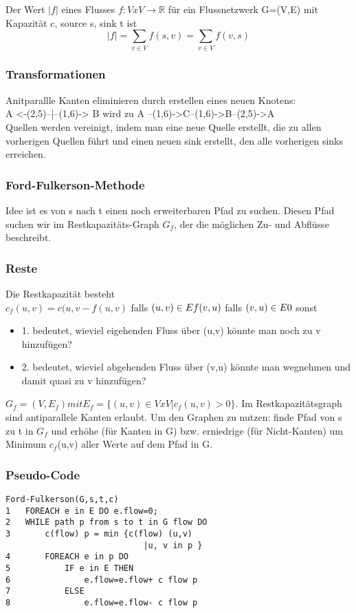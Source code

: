 \documentclass[jou,apacite]{apa6}
\begin{document}
Der Wert $|f|$ eines Flusses $f: VxV \rightarrow \mathbb{R}$ für ein Flussnetzwerk G=(V,E) mit Kapazität c, source s, sink t ist $$|f| = \sum\limits_{v\in V} f(s, v) = \sum\limits_{v\in V} f(v, s)$$

\subsubsection{Transformationen}
Anitparallle Kanten eliminieren durch erstellen eines neuen Knotens: \\
A <-(2,5)--|--(1,6)-> B wird zu A --(1,6)->C--(1,6)->B--(2,5)->A \\
Quellen werden vereinigt, indem man eine neue Quelle erstellt, die zu allen vorherigen Quellen führt und einen neuen sink erstellt, den alle vorherigen sinks erreichen.

\subsubsection{Ford-Fulkerson-Methode}
Idee ist es von s nach t einen noch erweiterbaren Pfad zu suchen. Diesen Pfad suchen wir im \dq Restkapazitäts\dq -Graph $G_f$, der die möglichen Zu- und Abflüsse beschreibt.\\

\subsubsection{Reste}
Die Restkapazität besteht \\ 
$c_f(u,v) = c(u,v - f(u,v)$ falls $(u,v) \in E \\ f(v,u)$ falls $(v,u) \in E \\ 0$ sonst \\
\begin{itemize}
    \item 1. bedeutet, wieviel eigehenden Fluss über (u,v) könnte man noch zu v hinzufügen?
    \item 2. bedeutet, wieviel abgehenden Fluss über (v,u) könnte man wegnehmen und damit quasi zu v hinzufügen?
\end{itemize}
$G_f = (V,E_f) mit E_f = \{ (u,v) \in V x V | c_f(u,v) > 0\}$. Im Restkapazitätsgraph sind antiparallele Kanten erlaubt. Um den Graphen zu nutzen: finde Pfad von s zu t in $G_f$ und erhöhe (für Kanten in G) bzw. erniedrige (für Nicht-Kanten) um Minimum $c_f$(u,v) aller Werte auf dem Pfad in G.

\subsubsection{Pseudo-Code}
\begin{lstlisting}
Ford-Fulkerson(G,s,t,c)
1   FOREACH e in E DO e.flow=0;
2   WHILE path p from s to t in G flow DO
3       c(flow) p = min {c(flow) (u,v) 
                            |u, v in p }
4       FOREACH e in p DO
5           IF e in E THEN
6               e.flow=e.flow+ c flow p
7           ELSE
8               e.flow=e.flow- c flow p
\end{lstlisting}
\end{document}
